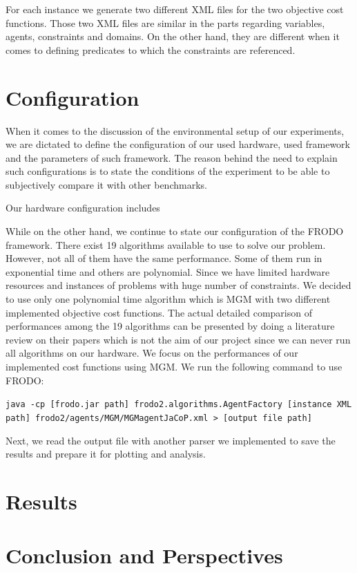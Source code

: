 \documentclass{article}
\begin{document}
	For each instance we generate two different XML files for the two objective cost functions. Those two XML files are similar in the parts regarding variables, agents, constraints and domains. On the other hand, they are different when it comes to defining predicates to which the constraints are referenced.
	
	\section{Configuration}
	When it comes to the discussion of the environmental setup of our experiments, we are dictated to define the configuration of our used hardware, used framework and the parameters of such framework. The reason behind the need to explain such configurations is to state the conditions of the experiment to be able to subjectively compare it with other benchmarks.
	
	Our hardware configuration includes 
	
	While on the other hand, we continue to state our configuration of the FRODO framework. There exist 19 algorithms available to use to solve our problem. However, not all of them have the same performance. Some of them run in exponential time and others are polynomial. Since we have limited hardware resources and instances of problems with huge number of constraints. We decided to use only one polynomial time algorithm which is MGM with two different implemented objective cost functions. The actual detailed comparison of performances among the 19 algorithms can be presented by doing a literature review on their papers which is not the aim of our project since we can never run all algorithms on our hardware. We focus on the performances of our implemented cost functions using MGM. We run the following command to use FRODO:
	
	\texttt{java -cp [frodo.jar path] frodo2.algorithms.AgentFactory [instance XML path] frodo2/agents/MGM/MGMagentJaCoP.xml > [output file path]}
	
	Next, we read the output file with another parser we implemented to save the results and prepare it for plotting and analysis.
	\section{Results}
	\section{Conclusion and Perspectives}
	\newpage
	
	
\end{document}
